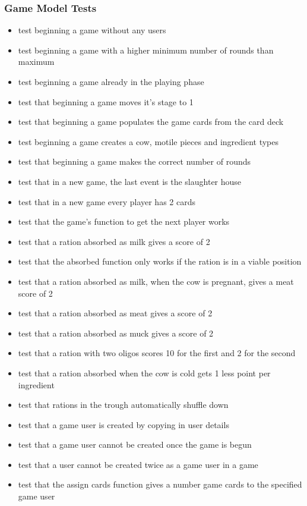 \subsubsection{Game Model Tests}
\begin{itemize}
	\item test beginning a game without any users
	\item test beginning a game with a higher minimum number of rounds than maximum
	\item test beginning a game already in the playing phase
	\item test that beginning a game moves it's stage to 1
	\item test that beginning a game populates the game cards from the card deck
	\item test beginning a game creates a cow, motile pieces and ingredient types
	\item test that beginning a game makes the correct number of rounds
	\item test that in a new game, the last event is the slaughter house
	\item test that in a new game every player has 2 cards
	\item test that the game's function to get the next player works
	\item test that a ration absorbed as milk gives a score of 2
	\item test that the absorbed function only works if the ration is in a viable position
	\item test that a ration absorbed as milk, when the cow is pregnant, gives a meat score of 2
	\item test that a ration absorbed as meat gives a score of 2
	\item test that a ration absorbed as muck gives a score of 2
	\item test that a ration with two oligos scores 10 for the first and 2 for the second
	\item test that a ration absorbed when the cow is cold gets 1 less point per ingredient
	\item test that rations in the trough automatically shuffle down
	\item test that a game user is created by copying in user details
	\item test that a game user cannot be created once the game is begun
	\item test that a user cannot be created twice as a game user in a game
	\item test that the assign cards function gives a number game cards to the specified game user

\end{itemize}
